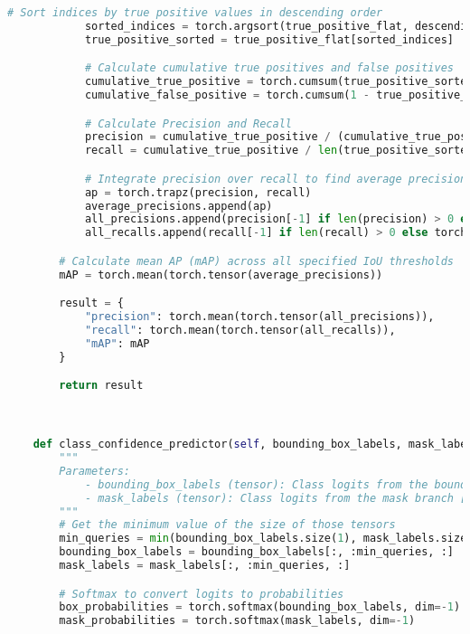 \begin{lstlisting}[language=Python, caption=Extended Masked-Attention Mask Transformer Model Class]
            # Sort indices by true positive values in descending order
            sorted_indices = torch.argsort(true_positive_flat, descending=True)
            true_positive_sorted = true_positive_flat[sorted_indices]

            # Calculate cumulative true positives and false positives
            cumulative_true_positive = torch.cumsum(true_positive_sorted.float(), dim=0)
            cumulative_false_positive = torch.cumsum(1 - true_positive_sorted.float(), dim=0)

            # Calculate Precision and Recall
            precision = cumulative_true_positive / (cumulative_true_positive + cumulative_false_positive + 1e-6)
            recall = cumulative_true_positive / len(true_positive_sorted)

            # Integrate precision over recall to find average precision (AP)
            ap = torch.trapz(precision, recall)
            average_precisions.append(ap)
            all_precisions.append(precision[-1] if len(precision) > 0 else torch.tensor(0.0))
            all_recalls.append(recall[-1] if len(recall) > 0 else torch.tensor(0.0))

        # Calculate mean AP (mAP) across all specified IoU thresholds
        mAP = torch.mean(torch.tensor(average_precisions))

        result = {
            "precision": torch.mean(torch.tensor(all_precisions)),
            "recall": torch.mean(torch.tensor(all_recalls)),
            "mAP": mAP
        }

        return result



    def class_confidence_predictor(self, bounding_box_labels, mask_labels):
        """        
        Parameters:
            - bounding_box_labels (tensor): Class logits from the bounding box branch [batch_size, num_queries, num_classes]
            - mask_labels (tensor): Class logits from the mask branch [batch_size, num_queries, num_classes]
        """
        # Get the minimum value of the size of those tensors
        min_queries = min(bounding_box_labels.size(1), mask_labels.size(1))
        bounding_box_labels = bounding_box_labels[:, :min_queries, :]
        mask_labels = mask_labels[:, :min_queries, :]

        # Softmax to convert logits to probabilities        
        box_probabilities = torch.softmax(bounding_box_labels, dim=-1)
        mask_probabilities = torch.softmax(mask_labels, dim=-1)


\end{lstlisting}
